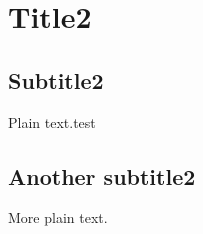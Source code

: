 \section{Title2}

\subsection{Subtitle2}

Plain text.test

\subsection{Another subtitle2}

More plain text.